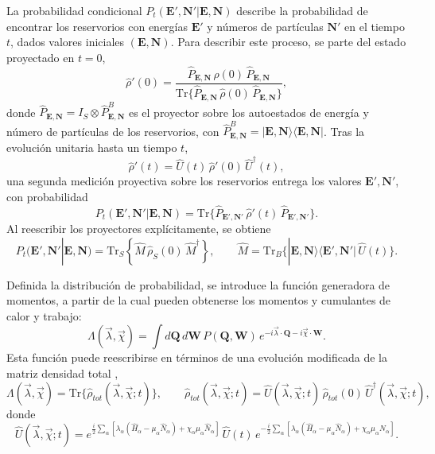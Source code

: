 La probabilidad condicional $P_{t}(\mathbf{E}',\mathbf{N}'|\mathbf{E},\mathbf{N})$ describe la probabilidad de encontrar los reservorios con energías $\mathbf{E}'$ y números de partículas $\mathbf{N}'$ en el tiempo $t$, dados valores iniciales $(\mathbf{E},\mathbf{N})$. Para describir este proceso, se parte del estado proyectado en $t=0$,
\[
\hat{\rho}'(0) =
\frac{\hat{P}_{\mathbf{E},\mathbf{N}}\,\hat{\rho}(0)\,\hat{P}_{\mathbf{E},\mathbf{N}}}
{\text{Tr}\{\hat{P}_{\mathbf{E},\mathbf{N}}\,\hat{\rho}(0)\,\hat{P}_{\mathbf{E},\mathbf{N}}\}},
\]
donde $\hat{P}_{\mathbf{E},\mathbf{N}} = I_{S}\otimes \hat{P}^{B}_{\mathbf{E},\mathbf{N}}$ es el proyector sobre los autoestados de energía y número de partículas de los reservorios, con 
$\hat{P}^{B}_{\mathbf{E},\mathbf{N}} = |\mathbf{E},\mathbf{N}\rangle\langle \mathbf{E},\mathbf{N}|$. Tras la evolución unitaria hasta un tiempo $t$,
\[
\hat{\rho}'(t) = \hat{U}(t)\,\hat{\rho}'(0)\,\hat{U}^{\dagger}(t),
\]
una segunda medición proyectiva sobre los reservorios entrega los valores $\mathbf{E}',\mathbf{N}'$, con probabilidad
\[
P_{t}(\mathbf{E}',\mathbf{N}'|\mathbf{E},\mathbf{N}) =
\text{Tr}\{\hat{P}_{\mathbf{E}',\mathbf{N}'}\,\hat{\rho}'(t)\,\hat{P}_{\mathbf{E}',\mathbf{N}'}\}.
\]
Al reescribir los proyectores explícitamente, se obtiene
\[
P_{t}(\mathbf{E}',\mathbf{N}'|\mathbf{E},\mathbf{N}) =
\text{Tr}_{S}\!\left\{\hat{M}\,\hat{\rho}_{S}(0)\,\hat{M}^{\dagger}\right\},
\qquad
\hat{M} = \text{Tr}_{B}\{|\mathbf{E},\mathbf{N}\rangle\langle \mathbf{E}',\mathbf{N}'|\,\hat{U}(t)\}.
\]

Definida la distribución de probabilidad, se introduce la función generadora de momentos, a partir de la cual pueden obtenerse los momentos y cumulantes de calor y trabajo:
\begin{equation}
    \Lambda(\vec{\lambda},\vec{\chi}) = 
    \int d\mathbf{Q}\, d\mathbf{W}\,P(\mathbf{Q},\mathbf{W})\,
    e^{-i\vec{\lambda}\cdot \mathbf{Q} -i\vec{\chi}\cdot \mathbf{W}}.
    \label{sec2funciongeneradora}
\end{equation}
Esta función puede reescribirse en términos de una evolución modificada de la matriz densidad total \cite{esposito2009nonequilibrium},
\begin{equation}
    \Lambda(\vec{\lambda},\vec{\chi}) = 
    \text{Tr}\{\hat{\rho}_{tot}(\vec{\lambda},\vec{\chi};t)\}, 
    \qquad 
    \hat{\rho}_{tot}(\vec{\lambda},\vec{\chi};t) 
    = \hat{U}(\vec{\lambda},\vec{\chi};t)\,\hat{\rho}_{tot}(0)\,
    \hat{U}^{\dagger}(\vec{\lambda},\vec{\chi};t),
    \label{sec2:evolucionconteo}
\end{equation}
donde
\[
\hat{U}(\vec{\lambda},\vec{\chi};t) = 
e^{\tfrac{i}{2}\sum_{\alpha}[\lambda_{\alpha}(\hat{H}_{\alpha}-\mu_{\alpha}\hat{N}_{\alpha})
+ \chi_{\alpha}\mu_{\alpha}\hat{N}_{\alpha}]} 
\,\hat{U}(t)\,
e^{-\tfrac{i}{2}\sum_{\alpha}[\lambda_{\alpha}(\hat{H}_{\alpha}-\mu_{\alpha}\hat{N}_{\alpha})
+ \chi_{\alpha}\mu_{\alpha}\hat{N}_{\alpha}]}.
\]

